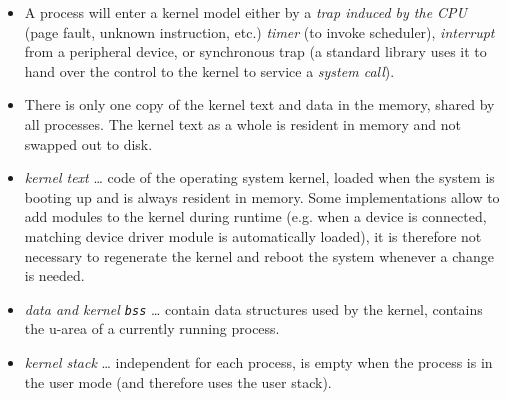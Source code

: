 
\begin{slide}
\begin{center}

\end{center}
\end{slide}

\begin{itemize}
\item A process will enter a kernel model either by a
\emph{trap induced by the CPU} (page fault, unknown instruction, etc.)
\emph{timer} (to invoke scheduler), \emph{interrupt} from a peripheral device,
or synchronous trap (a standard library uses it to hand over the control to
the kernel to service a \emph{system call}).
\item There is only one copy of the kernel text and data in the memory,
shared by all processes. The kernel text as a whole is resident in memory and
not swapped out to disk.
\item \emph{kernel text} \dots{} code of the operating system kernel,
loaded when the system is booting up and is always resident in memory.
Some implementations allow to add modules to the kernel during runtime
(e.g. when a device is connected, matching device driver module is
automatically loaded), it is therefore not necessary to regenerate
the kernel and reboot the system whenever a change is needed.
\item \emph{data and kernel \texttt{bss}} \dots{} contain data structures used
by the kernel, contains the u-area of a currently running process.
\item \emph{kernel stack} \dots{} independent for each process, is empty
when the process is in the user mode (and therefore uses the user stack).
\end{itemize}



\begin{slide}
\begin{center}

\end{center}
\end{slide}

